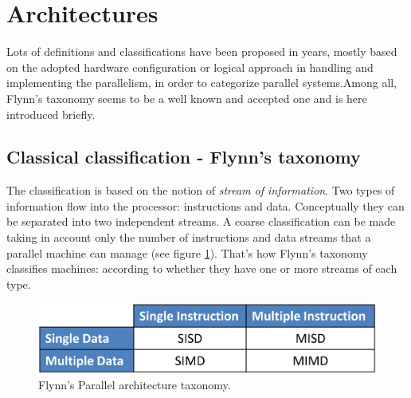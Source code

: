 \section{Architectures}
Lots of definitions and classifications have been proposed in years, mostly based on the adopted hardware configuration or logical approach in handling and implementing the parallelism, in order to categorize parallel systems.Among all, Flynn's taxonomy seems to be a well known and accepted one and is here introduced briefly.
\subsection{Classical classification - Flynn's taxonomy}
The classification is based on the notion of  \textit{stream of information}.
Two types of information flow into the processor: instructions and data.
Conceptually they can be separated into two independent streams. A coarse
classification can be made taking in account only the number of instructions and
 data streams that a parallel machine can manage (see figure \ref{fig:parallelClassification1}).
That's how Flynn's taxonomy\cite{Flynn1972} classifies machines: according to
whether they have one or more streams of each type.
\begin{figure}
\includegraphics[scale=0.28]{./images/parallel_programming/parallelClassification}
\caption[Flynn's Parallel architecture taxonomy]{Flynn's Parallel architecture taxonomy.}
\label{fig:parallelClassification1}
\end{figure}
